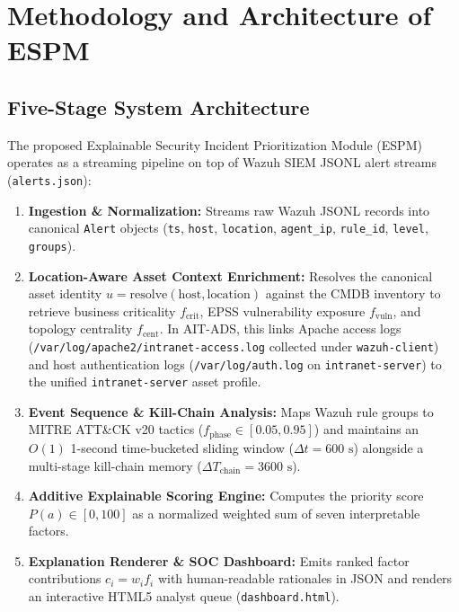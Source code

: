 %
%
\chapter{Methodology and Architecture of ESPM}
\label{chap:02}
\setlength{\parskip}{0.8em}

\section{Five-Stage System Architecture}
The proposed Explainable Security Incident Prioritization Module (ESPM) operates as a streaming pipeline on top of Wazuh SIEM JSONL alert streams (\texttt{alerts.json}):
\begin{enumerate}
    \item \textbf{Ingestion \& Normalization:} Streams raw Wazuh JSONL records into canonical \texttt{Alert} objects (\texttt{ts}, \texttt{host}, \texttt{location}, \texttt{agent\_ip}, \texttt{rule\_id}, \texttt{level}, \texttt{groups}).
    \item \textbf{Location-Aware Asset Context Enrichment:} Resolves the canonical asset identity $u = \text{resolve}(\text{host}, \text{location})$ against the CMDB inventory to retrieve business criticality $f_{\text{crit}}$, EPSS vulnerability exposure $f_{\text{vuln}}$, and topology centrality $f_{\text{cent}}$. In AIT-ADS, this links Apache access logs (\texttt{/var/log/apache2/intranet-access.log} collected under \texttt{wazuh-client}) and host authentication logs (\texttt{/var/log/auth.log} on \texttt{intranet-server}) to the unified \texttt{intranet-server} asset profile.
    \item \textbf{Event Sequence \& Kill-Chain Analysis:} Maps Wazuh rule groups to MITRE ATT\&CK v20 tactics ($f_{\text{phase}} \in [0.05, 0.95]$) and maintains an $O(1)$ 1-second time-bucketed sliding window ($\Delta t = 600\text{ s}$) alongside a multi-stage kill-chain memory ($\Delta T_{\text{chain}} = 3600\text{ s}$).
    \item \textbf{Additive Explainable Scoring Engine:} Computes the priority score $P(a) \in [0, 100]$ as a normalized weighted sum of seven interpretable factors.
    \item \textbf{Explanation Renderer \& SOC Dashboard:} Emits ranked factor contributions $c_i = w_i f_i$ with human-readable rationales in JSON and renders an interactive HTML5 analyst queue (\texttt{dashboard.html}).
\end{enumerate}


